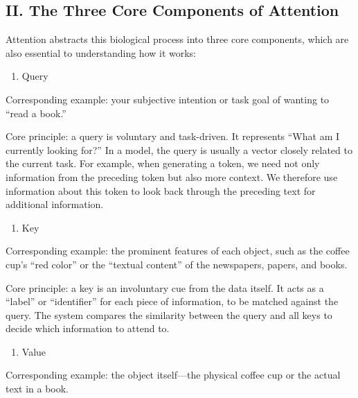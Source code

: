 \hypertarget{ii.-the-three-core-components-of-attention}{%
\subsection{II. The Three Core Components of Attention}\label{ii.-the-three-core-components-of-attention}}

Attention abstracts this biological process into three core components, which are also essential to understanding how it works:

\begin{enumerate}
\def\labelenumi{\arabic{enumi}.}
\tightlist
\item
  Query
\end{enumerate}

Corresponding example: your subjective intention or task goal of wanting to ``read a book.''

Core principle: a query is voluntary and task-driven. It represents ``What am I currently looking for?'' In a model, the query is usually a vector closely related to the current task. For example, when generating a token, we need not only information from the preceding token but also more context. We therefore use information about this token to look back through the preceding text for additional information.

\begin{enumerate}
\def\labelenumi{\arabic{enumi}.}
\setcounter{enumi}{1}
\tightlist
\item
  Key
\end{enumerate}

Corresponding example: the prominent features of each object, such as the coffee cup's ``red color'' or the ``textual content'' of the newspapers, papers, and books.

Core principle: a key is an involuntary cue from the data itself. It acts as a ``label'' or ``identifier'' for each piece of information, to be matched against the query. The system compares the similarity between the query and all keys to decide which information to attend to.

\begin{enumerate}
\def\labelenumi{\arabic{enumi}.}
\setcounter{enumi}{2}
\tightlist
\item
  Value
\end{enumerate}

Corresponding example: the object itself---the physical coffee cup or the actual text in a book.

